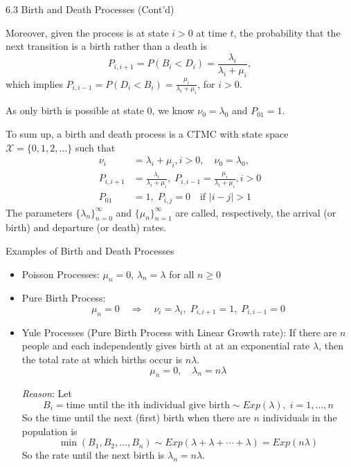 \documentclass[letterpaper,handout, mathserif]{beamer}
\def\X{\mathcal{X}}
\begin{document}
\begin{frame}{6.3 Birth and Death Processes (Cont'd)}

Moreover, given the process is at state $i>0$ at time $t$,
the probability that the next transition is a birth rather than a death is
$$
P_{i,i+1}=P(B_i<D_i)= \frac{\lambda_i}{\lambda_i +\mu_i},
$$ which implies $P_{i,i-1}=P(D_i<B_i) = \frac{\mu_i}{\lambda_i +\mu_i}$, for $i>0.$\smallskip\pause

As only birth is possible at state $0$, we know $\nu_0 = \lambda_0$ and $P_{01}=1$.\smallskip\pause

To sum up, a birth and death process is a CTMC with state space $\X=\{0,1,2,\ldots\}$ such that
\begin{align*}
\nu_i &= \lambda_i + \mu_i, i>0,\quad \nu_0 = \lambda_0,\\
P_{i,i+1} &= \frac{\lambda_i}{\lambda_i +\mu_i},\; P_{i,i-1} = \frac{\mu_i}{\lambda_i +\mu_i}, i>0\\
P_{01} &= 1,\; P_{i,j}=0 \quad\mbox{if }|i-j|>1
\end{align*}
The parameters $\{\lambda_n\}^{\infty}_{n=0}$ and $\{\mu_n\}^{\infty}_{n=1}$ are called, respectively, the arrival (or birth) and departure (or death) rates.
\end{frame}
\begin{frame}{Examples of Birth and Death Processes}
\begin{itemize}
\item Poisson Processes: $\mu_n=0$, $\lambda_n=\lambda$ for all $n\ge 0$
\item Pure Birth Process: $$\mu_n=0\quad \Rightarrow\quad \nu_i=\lambda_i,\; P_{i,i+1}=1,\; P_{i,i-1}=0$$
\item Yule Processes (Pure Birth Process with Linear Growth rate):
If there are $n$ people and each independently gives birth at at an exponential rate $\lambda$, then the total rate at which births occur is $n\lambda.$ $$\mu_n=0,\quad \lambda_n=n\lambda$$\pause

\vspace{-6pt}\textit{Reason}: Let
$$B_i = \text{time until the ith individual give birth}\sim Exp(\lambda),\; i=1,\ldots,n$$
So the time until the next (first) birth when there are $n$ individuals in the population is
$$
\min(B_1,B_2,\ldots,B_n) \sim Exp(\lambda+\lambda+\cdots+\lambda)=Exp(n\lambda)
$$
So the rate until the next birth is $\lambda_n=n\lambda$.
\end{itemize}
\end{frame}
\end{document}
